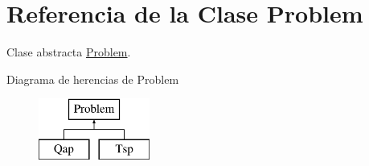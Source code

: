 \hypertarget{class_problem}{\section{Referencia de la Clase Problem}
\label{class_problem}
}


Clase abstracta \hyperlink{class_problem}{Problem}.  


Diagrama de herencias de Problem\begin{figure}[H]
\begin{center}
\leavevmode
\includegraphics[height=2.000000cm]{class_problem}
\end{center}
\end{figure}
